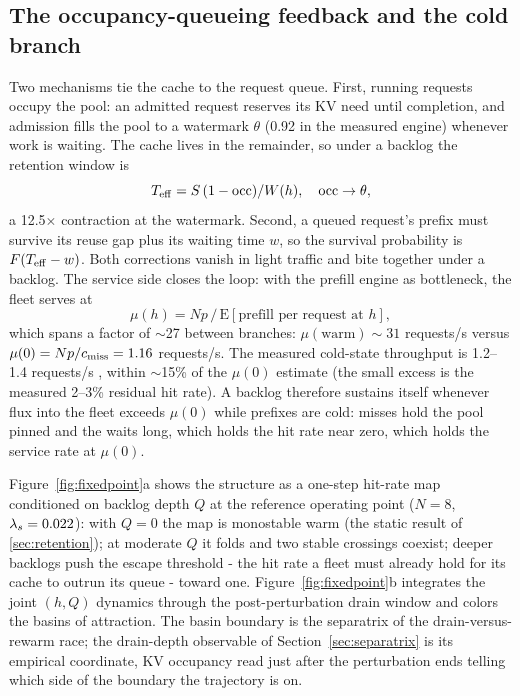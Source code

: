 \subsection{The occupancy-queueing feedback and the cold branch}
\label{sec:occupancy}

Two mechanisms tie the cache to the request queue. First, running
requests occupy the pool: an admitted request reserves its KV need
until completion, and admission fills the pool to a watermark $\theta$
(0.92 in the measured engine) whenever work is waiting. The cache
lives in the remainder, so under a backlog the retention window is
\begin{equation}
T_{\mathrm{eff}} = S\, (1 - \mathrm{occ}) / W(h), \quad \mathrm{occ} \to \theta,
\label{eq:teff}
\end{equation}
a 12.5$\times$ contraction at the watermark. Second, a queued request's
prefix must survive its reuse gap plus its waiting time $w$, so the
survival probability is $F(T_{\mathrm{eff}} - w)$. Both corrections vanish in
light traffic and bite together under a backlog. The service side
closes the loop: with the prefill engine as bottleneck, the fleet
serves at
\begin{equation}
\mu(h) = N p \,/\, \mathrm{E}[\text{prefill per request at } h],
\label{eq:mu}
\end{equation}
which spans a factor of $\sim$27 between branches: $\mu(\text{warm}) \sim 31$
requests/s versus $\mu(0) = N p / c_{\mathrm{miss}} = 1.16$ requests/s. The
measured cold-state throughput is 1.2--1.4 requests/s ,
within $\sim$15\% of the $\mu(0)$ estimate (the small excess is the measured
2--3\% residual hit rate). A backlog therefore sustains itself
whenever flux into the fleet exceeds $\mu(0)$ while prefixes are cold:
misses hold the pool pinned and the waits long, which holds the hit
rate near zero, which holds the service rate at $\mu(0)$.

Figure~\ref{fig:fixedpoint}a shows the structure as a one-step hit-rate map conditioned
on backlog depth $Q$ at the reference operating point ($N = 8$,
$\lambda_s = 0.022$): with $Q = 0$ the map is monostable warm (the static
result of \ref{sec:retention}); at moderate $Q$ it folds and two stable crossings
coexist; deeper backlogs push the escape threshold - the hit rate a
fleet must already hold for its cache to outrun its queue - toward
one. Figure~\ref{fig:fixedpoint}b integrates the joint $(h, Q)$ dynamics through the
post-perturbation drain window and colors the basins of attraction.
The basin boundary is the separatrix of the drain-versus-rewarm
race; the drain-depth observable of Section~\ref{sec:separatrix} is its empirical
coordinate, KV occupancy read just after the perturbation ends
telling which side of the boundary the trajectory is on.

